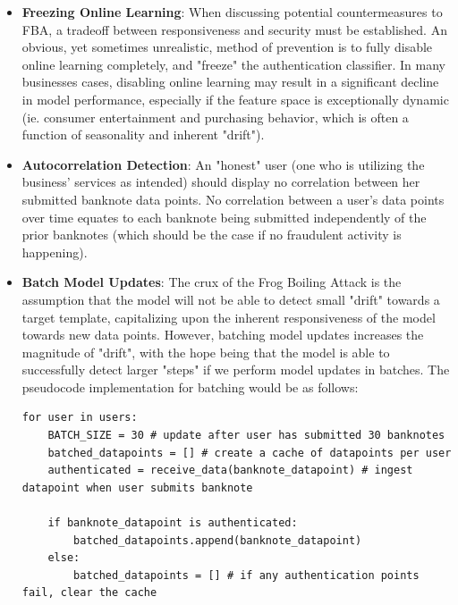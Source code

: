 \documentclass{article}
\begin{document}
\begin{itemize}
  \item \textbf{Freezing Online Learning}: When discussing potential countermeasures to FBA, a tradeoff between responsiveness and security must be established. An obvious, yet sometimes unrealistic, method of prevention is to fully disable online learning completely, and "freeze" the authentication classifier. In many businesses cases, disabling online learning may result in a significant decline in model performance, especially if the feature space is exceptionally dynamic (ie. consumer entertainment and purchasing behavior, which is often a function of seasonality and inherent "drift").
  \item \textbf{Autocorrelation Detection}: An "honest" user (one who is utilizing the business' services as intended) should display no correlation between her submitted banknote data points. No correlation between a user's data points over time equates to each banknote being submitted independently of the prior banknotes (which should be the case if no fraudulent activity is happening).
  \item \textbf{Batch Model Updates}: The crux of the Frog Boiling Attack is the assumption that the model will not be able to detect small "drift" towards a target template, capitalizing upon the inherent responsiveness of the model towards new data points. However, batching model updates increases the magnitude of "drift", with the hope being that the model is able to successfully detect larger "steps" if we perform model updates in batches. The pseudocode implementation for batching would be as follows:
\begin{lstlisting}
for user in users:
	BATCH_SIZE = 30 # update after user has submitted 30 banknotes
	batched_datapoints = [] # create a cache of datapoints per user
	authenticated = receive_data(banknote_datapoint) # ingest datapoint when user submits banknote
	
	if banknote_datapoint is authenticated:
		batched_datapoints.append(banknote_datapoint)
	else:
		batched_datapoints = [] # if any authentication points fail, clear the cache
		

\end{lstlisting}
\end{itemize}
\end{document}
